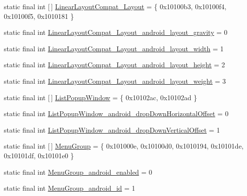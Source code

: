 \begin{DoxyCompactItemize}
\item 
static final int \mbox{[}$\,$\mbox{]} \mbox{\hyperlink{classandroid_1_1support_1_1design_1_1_r_1_1styleable_aa15b34677245387b51b9ce8ce236e56a}{Linear\+Layout\+Compat\+\_\+\+Layout}} = \{ 0x10100b3, 0x10100f4, 0x10100f5, 0x1010181 \}
\item 
static final int \mbox{\hyperlink{classandroid_1_1support_1_1design_1_1_r_1_1styleable_af6c8c39396ffc7f945642362c1b9f752}{Linear\+Layout\+Compat\+\_\+\+Layout\+\_\+android\+\_\+layout\+\_\+gravity}} = 0
\item 
static final int \mbox{\hyperlink{classandroid_1_1support_1_1design_1_1_r_1_1styleable_a7baa6f78e9b97ea62804abb450ea5fdb}{Linear\+Layout\+Compat\+\_\+\+Layout\+\_\+android\+\_\+layout\+\_\+width}} = 1
\item 
static final int \mbox{\hyperlink{classandroid_1_1support_1_1design_1_1_r_1_1styleable_a89a3ec25c91803224e2e3de68bda74d3}{Linear\+Layout\+Compat\+\_\+\+Layout\+\_\+android\+\_\+layout\+\_\+height}} = 2
\item 
static final int \mbox{\hyperlink{classandroid_1_1support_1_1design_1_1_r_1_1styleable_a9d088a0da6aac134d732ca1683da8969}{Linear\+Layout\+Compat\+\_\+\+Layout\+\_\+android\+\_\+layout\+\_\+weight}} = 3
\item 
static final int \mbox{[}$\,$\mbox{]} \mbox{\hyperlink{classandroid_1_1support_1_1design_1_1_r_1_1styleable_a90ef2283a7dff64bc22eed53a9aa1a73}{List\+Popup\+Window}} = \{ 0x10102ac, 0x10102ad \}
\item 
static final int \mbox{\hyperlink{classandroid_1_1support_1_1design_1_1_r_1_1styleable_a5cbe1721ac6cfb1ee789c9bf9756625f}{List\+Popup\+Window\+\_\+android\+\_\+drop\+Down\+Horizontal\+Offset}} = 0
\item 
static final int \mbox{\hyperlink{classandroid_1_1support_1_1design_1_1_r_1_1styleable_a1530f5817ae4dc538e7282df67a530a0}{List\+Popup\+Window\+\_\+android\+\_\+drop\+Down\+Vertical\+Offset}} = 1
\item 
static final int \mbox{[}$\,$\mbox{]} \mbox{\hyperlink{classandroid_1_1support_1_1design_1_1_r_1_1styleable_a39805bd4a947832cbac3bd5f30eef344}{Menu\+Group}} = \{ 0x101000e, 0x10100d0, 0x1010194, 0x10101de, 0x10101df, 0x10101e0 \}
\item 
static final int \mbox{\hyperlink{classandroid_1_1support_1_1design_1_1_r_1_1styleable_a1c4886b1aa7830d5f7de3e80324abcab}{Menu\+Group\+\_\+android\+\_\+enabled}} = 0
\item 
static final int \mbox{\hyperlink{classandroid_1_1support_1_1design_1_1_r_1_1styleable_a150a7837cc130e393e2d497a2df1d310}{Menu\+Group\+\_\+android\+\_\+id}} = 1

\end{DoxyCompactItemize}
